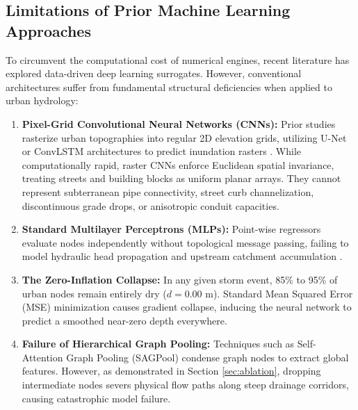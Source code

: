 \documentclass[conference]{IEEEtran}
\begin{document}
\subsection{Limitations of Prior Machine Learning Approaches}
To circumvent the computational cost of numerical engines, recent literature has explored data-driven deep learning surrogates. However, conventional architectures suffer from fundamental structural deficiencies when applied to urban hydrology:
\begin{enumerate}
    \item \textbf{Pixel-Grid Convolutional Neural Networks (CNNs):} Prior studies rasterize urban topographies into regular 2D elevation grids, utilizing U-Net or ConvLSTM architectures to predict inundation rasters \cite{lecun2015, ronneberger2015}. While computationally rapid, raster CNNs enforce Euclidean spatial invariance, treating streets and building blocks as uniform planar arrays. They cannot represent subterranean pipe connectivity, street curb channelization, discontinuous grade drops, or anisotropic conduit capacities.
    \item \textbf{Standard Multilayer Perceptrons (MLPs):} Point-wise regressors evaluate nodes independently without topological message passing, failing to model hydraulic head propagation and upstream catchment accumulation \cite{raissi2019}.
    \item \textbf{The Zero-Inflation Collapse:} In any given storm event, 85\% to 95\% of urban nodes remain entirely dry ($d = 0.00\text{ m}$). Standard Mean Squared Error (MSE) minimization causes gradient collapse, inducing the neural network to predict a smoothed near-zero depth everywhere.
    \item \textbf{Failure of Hierarchical Graph Pooling:} Techniques such as Self-Attention Graph Pooling (SAGPool) \cite{lee2019} condense graph nodes to extract global features. However, as demonstrated in Section \ref{sec:ablation}, dropping intermediate nodes severs physical flow paths along steep drainage corridors, causing catastrophic model failure.
\end{enumerate}
\end{document}
